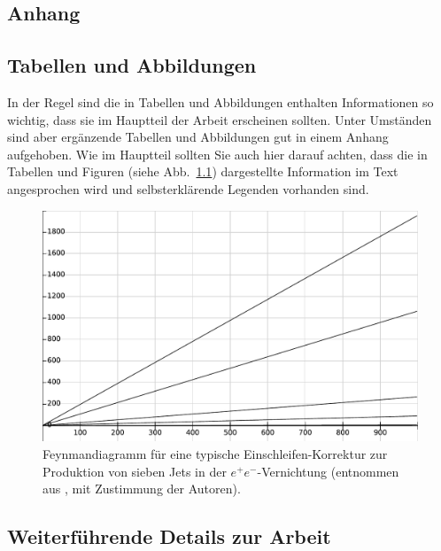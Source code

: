 \documentclass[a4paper,11pt,oneside,final,german,openbib,pdftex]{scrbook}
\begin{document}
\begin{appendix}
\chapter{Anhang}

\section{Tabellen und Abbildungen}

In der Regel sind die in Tabellen und Abbildungen enthalten Informationen 
so wichtig, dass sie im Hauptteil der Arbeit erscheinen sollten. Unter 
Umst\"anden sind aber erg\"anzende Tabellen und Abbildungen gut in einem 
Anhang aufgehoben. Wie im Hauptteil sollten Sie auch hier darauf achten, 
dass die in Tabellen und Figuren (siehe Abb.\ \ref{Abb:1}) dargestellte 
Information im Text angesprochen wird und selbsterkl\"arende Legenden 
vorhanden sind.
\medskip

\begin{figure}[h]
\begin{center}
\includegraphics[scale=0.8]{BA-Abbildung1.pdf}
\end{center}
\caption{\label{Abb:1}
Feynmandiagramm f\"ur eine typische Einschleifen-Korrektur zur 
Produktion von sieben Jets in der $e^+e^-$-Vernichtung (entnommen 
aus \cite{thepnews}, mit Zustimmung der Autoren).
} 
\end{figure}


\section{Weiterf\"uhrende Details zur Arbeit}


\end{appendix}
\end{document}

